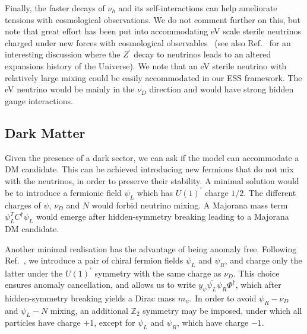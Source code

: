 Finally, the faster decays of $\nu_h$ and its self-interactions can help ameliorate tensions with cosmological observations. We do not comment further on this, but note that great effort has been put into accommodating eV scale sterile neutrinos charged under new forces with cosmological observables~\cite{Hannestad:2013ana,Dasgupta:2013zpn,Mirizzi:2014ama,Chu:2015ipa,Cherry:2016jol,Chu:2018gxk,Song:2018zyl} (see also Ref.~\cite{Escudero:2019gzq} for an interesting discussion where the $Z^\prime$ decay to neutrinos leads to an altered expansions history of the Universe). We note that an eV sterile neutrino with relatively large mixing could be easily accommodated in our ESS framework. The eV neutrino would be mainly in the $\nu_D$ direction and would have strong hidden gauge interactions.

\subsection{Dark Matter} \label{sec:DM}
Given the presence of a dark sector, we can ask if the model can accommodate a DM candidate. This can be achieved introducing new fermions that do not mix with the neutrinos, in order to preserve their stability. A minimal solution would be to introduce a fermionic field $\psi_L$ which has $U(1)^\prime$ charge $1/2$. The different charges of $\psi$, $\nu_D$ and $N$ would forbid neutrino mixing. A Majorana mass term $\psi_L^T C^\dagger \psi_L$ would emerge after hidden-symmetry breaking leading to a Majorana DM candidate. 

Another minimal realisation has the advantage of being anomaly free. Following Ref.~\cite{Blennow:2019fhy}, we introduce a pair of chiral fermion fields $\psi_L$ and $\psi_R$, and charge only the latter under the $U(1)^\prime$ symmetry with the same charge as $\nu_D$. This choice ensures anomaly cancellation, and allows us to write $y_{\psi} \overline{\psi_L} \psi_R \Phi^\dagger$, which after hidden-symmetry breaking yields a Dirac mass $m_\psi$. In order to avoid $\psi_R-\nu_D$ and $\psi_L-N$ mixing, an additional $\mathbb{Z}_2$ symmetry may be imposed, under which all particles have charge $+1$, except for $\psi_L$ and $\psi_R$, which have charge $-1$.

